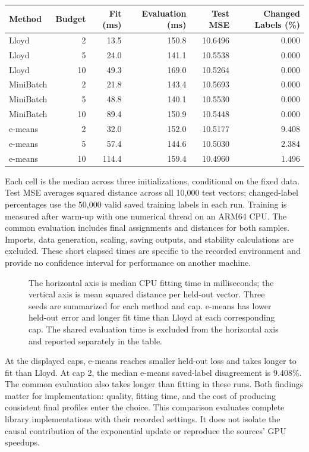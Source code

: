 \begin{table}[H]
\centering\small
\begin{tabular}{@{}lrrrrr@{}}
\toprule
Method & Budget & Fit (ms) & Evaluation (ms) & Test MSE & Changed Labels
(\%) \\
\midrule

Lloyd & 2 & 13.5 & 150.8 & 10.6496 & 0.000 \\
Lloyd & 5 & 24.0 & 141.1 & 10.5538 & 0.000 \\
Lloyd & 10 & 49.3 & 169.0 & 10.5264 & 0.000 \\
MiniBatch & 2 & 21.8 & 143.4 & 10.5693 & 0.000 \\
MiniBatch & 5 & 48.8 & 140.1 & 10.5530 & 0.000 \\
MiniBatch & 10 & 89.4 & 150.9 & 10.5448 & 0.000 \\
e-means & 2 & 32.0 & 152.0 & 10.5177 & 9.408 \\
e-means & 5 & 57.4 & 144.6 & 10.5030 & 2.384 \\
e-means & 10 & 114.4 & 159.4 & 10.4960 & 1.496 \\
\bottomrule
\end{tabular}
\end{table}

Each cell is the median across three initializations, conditional on the
fixed data. Test MSE averages squared distance across all 10,000 test
vectors; changed-label percentages use the 50,000 valid saved training
labels in each run. Training is measured after warm-up with one
numerical thread on an ARM64 CPU. The common evaluation includes final
assignments and distances for both samples. Imports, data generation,
scaling, saving outputs, and stability calculations are excluded. These
short elapsed times are specific to the recorded environment and provide
no confidence interval for performance on another machine.

\begin{figure}[htbp]
\centering

\caption{The horizontal axis is median CPU fitting time in milliseconds; the vertical axis is mean squared distance per held-out vector. Three seeds are summarized for each method and cap. e-means has lower held-out error and longer fit time than Lloyd at each corresponding cap. The shared evaluation time is excluded from the horizontal axis and reported separately in the table.}\label{fig:M04_clustering_cost}
\end{figure}

At the displayed caps, e-means reaches smaller held-out loss and takes
longer to fit than Lloyd. At cap 2, the median e-means saved-label
disagreement is 9.408\%. The common evaluation also takes longer than
fitting in these runs. Both findings matter for implementation: quality,
fitting time, and the cost of producing consistent final profiles enter
the choice. This comparison evaluates complete library implementations
with their recorded settings. It does not isolate the causal
contribution of the exponential update or reproduce the sources' GPU
speedups.

